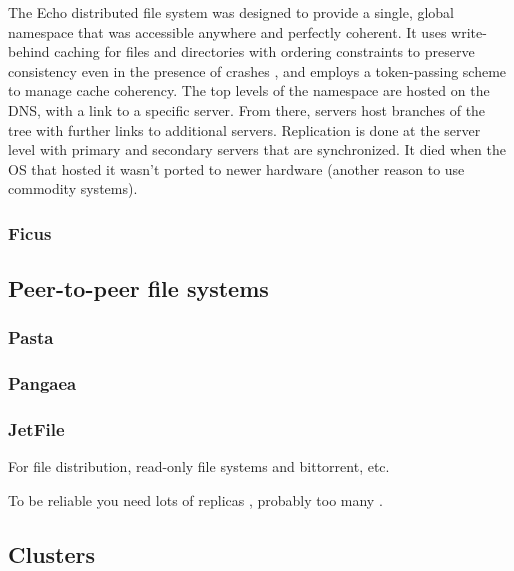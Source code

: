 The Echo distributed file system \cite{birrell93} was designed to provide a single, global namespace that was accessible anywhere and perfectly coherent. It uses write-behind caching for files and directories with ordering constraints to preserve consistency even in the presence of crashes \cite{mann}, and employs a token-passing scheme to manage cache coherency. The top levels of the namespace are hosted on the DNS, with a link to a specific server. From there, servers host branches of the tree with further links to additional servers. Replication is done at the server level with primary and secondary servers that are synchronized. It died when the OS that hosted it wasn't ported to newer hardware (another reason to use commodity systems).

\subsubsection{Ficus}
\cite{popek}

\subsection{Peer-to-peer file systems}
\subsubsection{Pasta}
\cite{moreton}
\subsubsection{Pangaea}
\cite{saito02}
\cite{stein02}
\subsubsection{JetFile}
\cite{gronvall}

For file distribution, read-only file systems \cite{fu} and bittorrent, etc.

To be reliable you need lots of replicas \cite{rabin}, probably too many \cite{blake}.

\cite{kim}\cite{mummert}\cite{sobti}

\subsection{Clusters}

